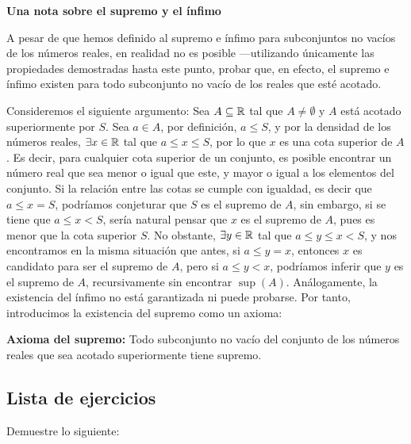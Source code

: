 \textbf{Una nota sobre el supremo y el ínfimo}

A pesar de que hemos definido al supremo e ínfimo para subconjuntos no vacíos de los números reales, en realidad no es posible ---utilizando únicamente las propiedades demostradas hasta este punto, probar que, en efecto, el supremo e ínfimo existen para todo subconjunto no vacío de los reales que esté acotado.

Consideremos el siguiente argumento: Sea $A\subseteq \mathbb{R}$ tal que $A\neq \emptyset$ y $A$ está acotado superiormente por $S$. Sea $a\in A$, por definición, $a\leq S$, y por la densidad de los números reales, $\exists x\in \mathbb{R}$ tal que $a\leq x \leq S$, por lo que $x$ es una cota superior de $A$. Es decir, para cualquier cota superior de un conjunto, es posible encontrar un número real que sea menor o igual que este, y mayor o igual a los elementos del conjunto. Si la relación entre las cotas se cumple con igualdad, es decir que $a\leq x = S$, podríamos conjeturar que $S$ es el supremo de $A$, sin embargo, si se tiene que $a\leq x < S$, sería natural pensar que $x$ es el supremo de $A$, pues es menor que la cota superior $S$. No obstante, $\exists y\in \mathbb{R}$ tal que $a\leq y \leq x<S$, y nos encontramos en la misma situación que antes, si $a\leq y = x$, entonces $x$ es candidato para ser el supremo de $A$, pero si $a\leq y < x$, podríamos inferir que $y$ es el supremo de $A$, recursivamente sin encontrar $\sup(A)$. Análogamente, la existencia del ínfimo no está garantizada ni puede probarse. Por tanto, introducimos la existencia del supremo como un axioma:

\textbf{Axioma del supremo:} Todo subconjunto no vacío del conjunto de los números reales que sea acotado superiormente tiene supremo.

\subsection*{Lista de ejercicios}

Demuestre lo siguiente:

